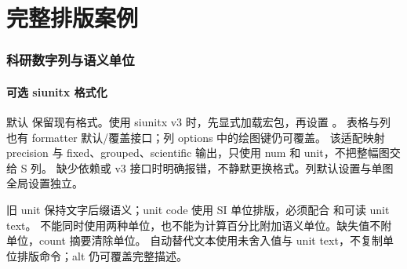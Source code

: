 \part{完整排版案例}



\section{科研数字列与语义单位}
\subsection{可选 siunitx 格式化}
默认  保留现有格式。使用 siunitx v3 时，先显式加载宏包，再设置 。
表格与列也有 formatter 默认/覆盖接口；列 options 中的绘图键仍可覆盖。
该适配映射 precision 与 fixed、grouped、scientific 输出，只使用 num 和 unit，不把整幅图交给 S 列。
缺少依赖或 v3 接口时明确报错，不静默更换格式。列默认设置与单图全局设置独立。
\begin{codeonly}
\usepackage{siunitx}
\usepackage{gradbars}
\end{codeonly}
旧 unit 保持文字后缀语义；unit code 使用 SI 单位排版，必须配合  和可读 unit text。
不能同时使用两种单位，也不能为计算百分比附加语义单位。缺失值不附单位，count 摘要清除单位。
自动替代文本使用未舍入值与 unit text，不复制单位排版命令；alt 仍可覆盖完整描述。
